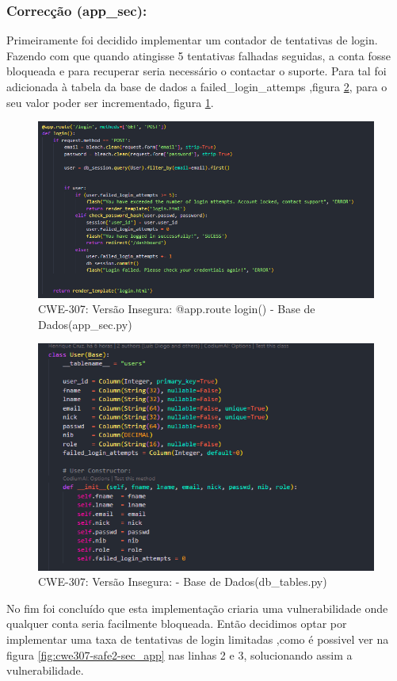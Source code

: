 \subsubsection{Correcção (app\_sec):}
Primeiramente foi decidido implementar um contador de tentativas de login. Fazendo com que quando atingisse 5 tentativas falhadas seguidas, a conta fosse bloqueada e para recuperar seria necessário o contactar o suporte. Para tal foi adicionada à tabela da base de dados a failed\_login\_attemps ,figura \ref{fig:cwe307-safe-sec_db_tables}, para o seu valor poder ser incrementado, figura \ref{fig:cwe307-safe-sec_app}.
\begin{figure}[H]
  \centering
  \includegraphics[width=0.8\linewidth]{images/CWE307-safe-sec_app.png}
  \caption{CWE-307: Versão Insegura: @app.route login() - Base de Dados(app\_sec.py)}
  \label{fig:cwe307-safe-sec_app}
\end{figure}
\begin{figure}[H]
  \centering
  \includegraphics[width=0.8\linewidth]{images/CWE307-safe-sec_db_tables.png}
  \caption{CWE-307: Versão Insegura: - Base de Dados(db\_tables.py)}
  \label{fig:cwe307-safe-sec_db_tables}
\end{figure}
No fim foi concluído que esta implementação criaria uma vulnerabilidade onde qualquer conta seria facilmente bloqueada. Então decidimos optar por implementar uma taxa de tentativas de login limitadas ,como é possivel ver na figura \ref{fig:cwe307-safe2-sec_app} nas linhas 2 e 3, solucionando assim a vulnerabilidade.
